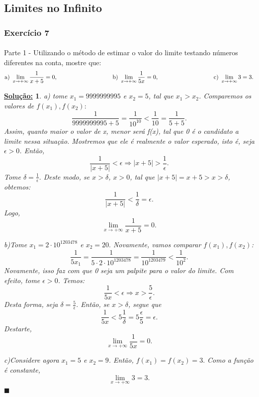 \documentclass{article}
\newtheorem*{sol*}{\underline{Solu\c c\~ao:}}
\renewcommand\qedsymbol{$\blacksquare$}
\begin{document}
\subsection{Limites no Infinito}
\subsubsection{Exerc\'icio 7}
\paragraph{}Parte 1 - Utilizando o m\'etodo de estimar o valor do limite testando n\'umeros diferentes na conta, mostre que:
$$
	\text{a) }\lim_{x\to+\infty}\frac{1}{x + 5} = 0,\hspace{3.3cm}
	\text{b) }\lim_{x\to+\infty}\frac{1}{5x} = 0,\hspace{3.3cm}
	\text{c) }\lim_{x\to+\infty}3 = 3.
$$
\begin{sol*}
	a) tome $x_1 = 9999999995$ e $x_2 = 5$, tal que $x_1 > x_2$. Comparemos os valores de $f(x_1), f(x_2):$
	$$
		\frac{1}{9999999995 + 5} =\frac{1}{10^10} < \frac{1}{10} = \frac{1}{5 + 5}.
	$$
	Assim, quanto maior o valor de x, menor ser\'a f(x), tal que 0 \'e o candidato a limite nessa situa\c c\~ao. Mostremos que ele \'e realmente o valor esperado, isto \'e, seja $\epsilon > 0$. Ent\~ao,
	$$
		\frac{1}{|x + 5|} < \epsilon \Rightarrow |x + 5| > \frac{1}{\epsilon}.
	$$
	Tome $\delta = \frac{1}{\epsilon}.$ Deste modo, se $x > \delta$, $x > 0$, tal que $|x + 5| = x + 5 > x > \delta$, obtemos:
	$$
		\frac{1}{|x + 5|} < \frac{1}{\delta} = \epsilon.
	$$
	Logo,
	$$
		\lim_{x\to+\infty}\frac{1}{x + 5} = 0.
	$$

	b)Tome $x_1 = 2\cdot{10^{1203478}}$ e $x_2 = 20.$ Novamente, vamos comparar $f(x_1), f(x_2)$:
	$$
		\frac{1}{5x_1} = \frac{1}{5\cdot2\cdot{10^{1203478}}} = \frac{1}{10^{1203479}} < \frac{1}{10^2}.
	$$
	Novamente, isso faz com que 0 seja um palpite para o valor do limite. Com efeito, tome $\epsilon > 0$. Temos:
	$$
		\frac{1}{5x} < \epsilon \Rightarrow x > \frac{5}{\epsilon}.
	$$
	Desta forma, seja $\delta = \frac{5}{\epsilon}.$ Ent\~ao, se $x > \delta$, segue que
	$$
		\frac{1}{5x} < 5\frac{1}{\delta} = 5\frac{\epsilon}{5} = \epsilon.
	$$
	Destarte,
	$$
		\lim_{x\to+\infty}\frac{1}{5x} = 0.
	$$

	c)Considere agora $x_1 = 5$ e $x_2 = 9$. Ent\~ao, $f(x_1) = f(x_2) = 3.$ Como a fun\c c\~ao \'e constante,
	$$
		\lim_{x\to+\infty}3 = 3.
	$$
	\qedsymbol
\end{sol*}
\end{document}
